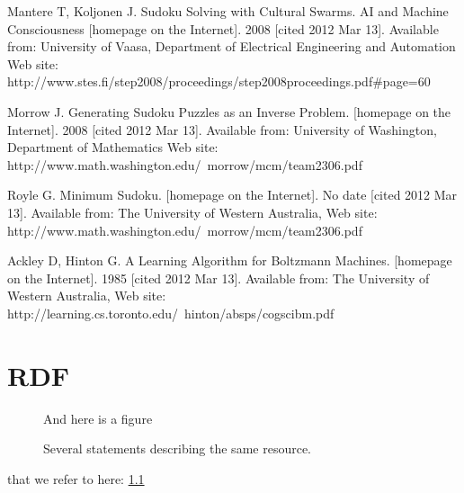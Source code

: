 \documentclass[a4paper,11pt]{kth-mag}
\begin{document}
\begin{thebibliography}{99}
Mantere T, Koljonen J. Sudoku Solving with Cultural Swarms. AI and Machine Consciousness [homepage on the Internet]. 2008 [cited 2012 Mar 13]. Available from: University of Vaasa, Department of Electrical Engineering and Automation Web site: http://www.stes.fi/step2008/proceedings/step2008proceedings.pdf\#page=60

Morrow J. Generating Sudoku Puzzles as an Inverse Problem. [homepage on the Internet]. 2008 [cited 2012 Mar 13]. Available from: University of Washington, Department of Mathematics Web site: http://www.math.washington.edu/~morrow/mcm/team2306.pdf

Royle G. Minimum Sudoku. [homepage on the Internet]. No date [cited 2012 Mar 13]. Available from: The University of Western Australia, Web site: http://www.math.washington.edu/~morrow/mcm/team2306.pdf

Ackley D, Hinton G. A Learning Algorithm for Boltzmann Machines. [homepage on the Internet]. 1985 [cited 2012 Mar 13]. Available from: The University of Western Australia, Web site: http://learning.cs.toronto.edu/~hinton/absps/cogscibm.pdf

\end{thebibliography}

\appendix
\addappheadtotoc
\chapter{RDF}\label{appA}

\begin{figure}[ht]
\begin{center}
And here is a figure
\caption{\small{Several statements describing the same resource.}}\label{RDF_4}
\end{center}
\end{figure}

that we refer to here: \ref{RDF_4}
\end{document}
